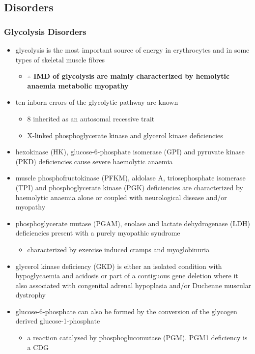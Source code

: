 \documentclass{scrartcl}
\begin{document}
\subsection{Disorders}
\label{sec:org207533e}
\subsubsection{Glycolysis Disorders}
\label{sec:orgde874e5}
\begin{itemize}
\item glycolysis is the most important source of energy in erythrocytes
and in some types of skeletal muscle fibres

\begin{itemize}
\item \textbf{\(\therefore\) IMD of glycolysis are mainly characterized by hemolytic}
\textbf{anaemia \textpm{} metabolic myopathy}
\end{itemize}

\item ten inborn errors of the glycolytic pathway are known
\begin{itemize}
\item 8 inherited as an autosomal recessive trait
\item X-linked phosphoglycerate kinase and glycerol kinase deficiencies
\end{itemize}

\item hexokinase (HK), glucose-6-phosphate isomerase (GPI) and pyruvate
kinase (PKD) deficiencies cause severe haemolytic anaemia

\item muscle phosphofructokinase (PFKM), aldolase A, triosephosphate
isomerase (TPI) and phosphoglycerate kinase (PGK) deficiencies are
characterized by haemolytic anaemia alone or coupled with
neurological disease and/or myopathy

\item phosphoglycerate mutase (PGAM), enolase and lactate dehydrogenase
(LDH) deficiencies present with a purely myopathic syndrome
\begin{itemize}
\item characterized by exercise induced cramps and myoglobinuria
\end{itemize}

\item glycerol kinase deficiency (GKD) is either an isolated condition
with hypoglycaemia and acidosis or part of a contiguous
gene deletion where it also associated with congenital adrenal
hypoplasia and/or Duchenne muscular dystrophy

\item glucose-6-phosphate can also be formed by the conversion of the
glycogen derived glucose-1-phosphate

\begin{itemize}
\item a reaction catalysed by
phosphoglucomutase (PGM). PGM1 deficiency is a CDG
\end{itemize}
\end{itemize}
\end{document}
